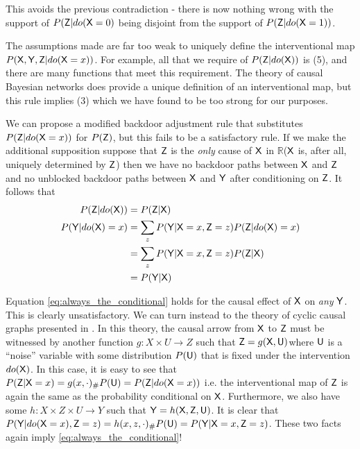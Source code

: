 This avoids the previous contradiction - there is now nothing wrong with the support of $P(\mathsf{Z}|do(\mathsf{X}=0)$ being disjoint from the support of $P(\mathsf{Z}|do(\mathsf{X}=1))$. 

The assumptions made are far too weak to uniquely define the interventional map $P(\mathsf{X},\mathsf{Y},\mathsf{Z}|do(\mathsf{X}=x))$. For example, all that we require of $P(\mathsf{Z}|do(\mathsf{X}))$ is (5), and there are many functions that meet this requirement. The theory of causal Bayesian networks does provide a unique definition of an interventional map, but this rule implies (3) which we have found to be too strong for our purposes.

We can propose a modified backdoor adjustment rule that substitutes $P(\mathsf{Z}|do(\mathsf{X}=x))$ for $P(\mathsf{Z})$, but this fails to be a satisfactory rule. If we make the additional supposition suppose that $\mathsf{Z}$ is the \emph{only} cause of $\mathsf{X}$ in $\mathbb{R}$($\mathsf{X}$ is, after all, uniquely determined by $\mathsf{Z}$) then we have no backdoor paths between $\mathsf{X}$ and $\mathsf{Z}$ and no unblocked backdoor paths between $\mathsf{X}$ and $\mathsf{Y}$ after conditioning on $\mathsf{Z}$. It follows that
\begin{align}
	P(\mathsf{Z}|do(\mathsf{X})) &= P(\mathsf{Z}|\mathsf{X})\\
	P(\mathsf{Y}|do(\mathsf{X})=x) &= \sum_{z} P(\mathsf{Y}|\mathsf{X}=x,\mathsf{Z}=z) P(\mathsf{Z}|do(\mathsf{X})=x)\\
						   &= \sum_z P(\mathsf{Y}|\mathsf{X}=x,\mathsf{Z}=z) P(\mathsf{Z}|\mathsf{X})\\
						   &= P(\mathsf{Y}|\mathsf{X}) \label{eq:always_the_conditional}
\end{align}

Equation \ref{eq:always_the_conditional} holds for the causal effect of $\mathsf{X}$ on \emph{any} $\mathsf{Y}$. This is clearly unsatisfactory. We can turn instead to the theory of cyclic causal graphs presented in \cite{forre_constraint-based_2018}. In this theory, the causal arrow from $\mathsf{X}$ to $\mathsf{Z}$ must be witnessed by another function $g:X\times U\to Z$ such that $\mathsf{Z}=g(\mathsf{X},\mathsf{U})$where $\mathsf{U}$ is a ``noise'' variable with some distribution $P(\mathsf{U})$ that is fixed under the intervention $do(\mathsf{X})$. In this case, it is easy to see that $P(\mathsf{Z}|\mathsf{X}=x)=g(x,\cdot)_\# P(\mathsf{U})=P(\mathsf{Z}|do(\mathsf{X}=x))$ i.e. the interventional map of $\mathsf{Z}$ is again the same as the probability conditional on $\mathsf{X}$. Furthermore, we also have some $h:X\times Z\times U\to Y$ such that $\mathsf{Y}=h(\mathsf{X},\mathsf{Z},\mathsf{U})$. It is clear that $P(\mathsf{Y}|do(\mathsf{X}=x),\mathsf{Z}=z) = h(x,z,\cdot)_\# P(\mathsf{U}) = P(\mathsf{Y}|\mathsf{X}=x,\mathsf{Z}=z)$. These two facts again imply \ref{eq:always_the_conditional}!

